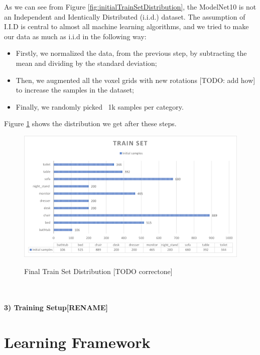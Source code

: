 As we can see from Figure \ref{fig:initialTrainSetDistribution}, the ModelNet10 is not an Independent and Identically Distributed (i.i.d.) dataset. The assumption of I.I.D is central to almost all machine learning algorithms, and we tried to make our data as much as i.i.d in the following way:
\begin{itemize}
	\item Firstly, we normalized the data, from the previous step, by subtracting the mean and dividing by the standard deviation;
	\item Then, we augmented all the voxel grids with new rotations [TODO: add how] to increase the samples in the dataset;
	\item Finally, we randomly picked ~1k samples per category.
\end{itemize}
Figure \ref{fig:finalTrainSetDistribution} shows the distribution we get after these steps.
\begin{figure}[]
	\centering
	\caption{Final Train Set Distribution [TODO correctone]}
	\includegraphics[scale = 0.45]{resources/distribution.png}
	\label{fig:finalTrainSetDistribution}
\end{figure}
\  \\\\
\textbf{3) Training Setup[RENAME]}


\section{Learning Framework}
\label{sec:learning_framework}


